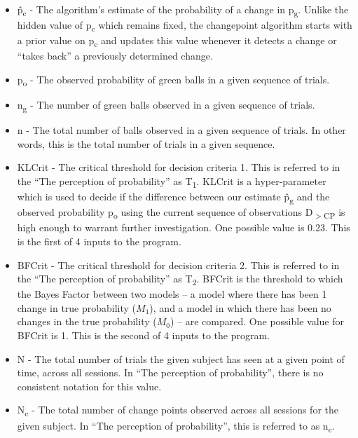 \documentclass{article}
\begin{document}
\begin{itemize}
\item \^{p\textsubscript{c}} - The algorithm's estimate of the probability of a change in p\textsubscript{g}. Unlike the hidden value of p\textsubscript{c} which remains fixed, the changepoint algorithm starts with a  prior value on p\textsubscript{c} and updates this value whenever it detects a change or ``takes back'' a previously determined change.

\item p\textsubscript{o} - The observed probability of green balls in a given sequence of trials. 

\item n\textsubscript{g} - The number of green balls observed in a given sequence of trials.

\item n - The total number of balls observed in a given sequence of trials. In other words, this is the total number of trials in a given sequence.

\item KLCrit - The critical threshold for decision criteria 1. This is referred to in the ``The perception of probability'' as T\textsubscript{1}. KLCrit is a hyper-parameter which is used to decide if the difference between our estimate \^{p\textsubscript{g}} and the observed probability p\textsubscript{o} using the current sequence of observations D\textsubscript{$>$CP} is high enough to warrant further investigation. One possible value is 0.23. This is the first of 4 inputs to the program.

\item BFCrit - The critical threshold for decision criteria 2. This is referred to in the ``The perception of probability'' as T\textsubscript{2}. BFCrit is the threshold to which the Bayes Factor between two models -- a model where there has been 1 change in true probability ($M_1$), and a model in which there has been no changes in the true probability ($M_0$) -- are compared. One possible value for BFCrit is 1. This is the second of 4 inputs to the program.

\item N - The total number of trials the given subject has seen at a given point of time, across all sessions. In ``The perception of probability'', there is no consistent notation for this value.

\item N\textsubscript{c} - The total number of change points observed across all sessions for the given subject. In ``The perception of probability'', this is referred to as n\textsubscript{c}.
 

\end{itemize}
\end{document}
